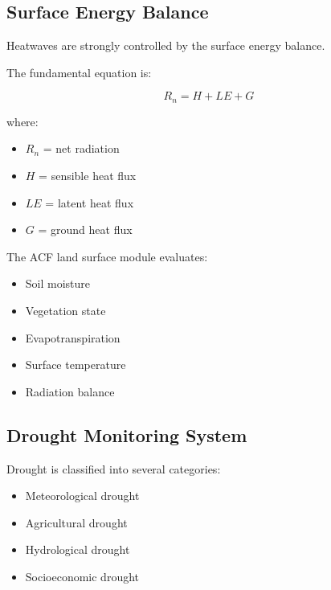 
\subsection{Surface Energy Balance}

Heatwaves are strongly controlled by the surface energy balance.

The fundamental equation is:

\[
R_n=
H+
LE+
G
\]


where:

\begin{itemize}

\item $R_n$ = net radiation

\item $H$ = sensible heat flux

\item $LE$ = latent heat flux

\item $G$ = ground heat flux

\end{itemize}


The ACF land surface module evaluates:

\begin{itemize}

\item Soil moisture

\item Vegetation state

\item Evapotranspiration

\item Surface temperature

\item Radiation balance

\end{itemize}



\subsection{Drought Monitoring System}

Drought is classified into several categories:

\begin{itemize}

\item Meteorological drought

\item Agricultural drought

\item Hydrological drought

\item Socioeconomic drought

\end{itemize}


